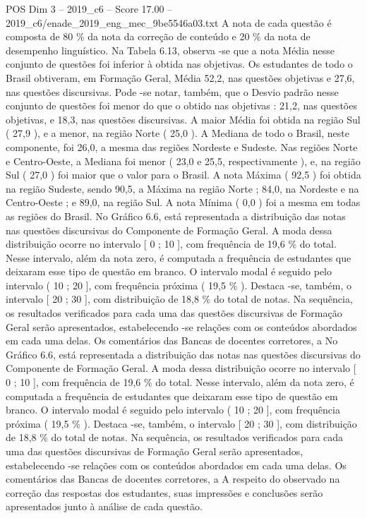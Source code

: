 \begin{textsample}{POS Dim 3 – 2019\_c6 – Score 17.00 – 2019\_c6/enade\_2019\_eng\_mec\_9be5546a03.txt}
A nota de cada questão é composta de 80 \% da nota da correção de conteúdo e 20 \% da nota de desempenho linguístico.
Na Tabela 6.13, observa -se que a nota Média nesse conjunto de questões foi inferior à obtida nas objetivas.
Os estudantes de todo o Brasil obtiveram, em Formação Geral, Média 52,2, nas questões objetivas e 27,6, nas questões discursivas.
Pode -se notar, também, que o Desvio padrão nesse conjunto de questões foi menor do que o obtido nas objetivas : 21,2, nas questões objetivas, e 18,3, nas questões discursivas.
A maior Média foi obtida na região Sul ( 27,9 ), e a menor, na região Norte ( 25,0 ).
A Mediana de todo o Brasil, neste componente, foi 26,0, a mesma das regiões Nordeste e Sudeste.
Nas regiões Norte e Centro-Oeste, a Mediana foi menor ( 23,0 e 25,5, respectivamente ), e, na região Sul ( 27,0 ) foi maior que o valor para o Brasil.
A nota Máxima ( 92,5 ) foi obtida na região Sudeste, sendo 90,5, a Máxima na região Norte ; 84,0, na Nordeste e na Centro-Oeste ; e 89,0, na região Sul.
A nota Mínima ( 0,0 ) foi a mesma em todas as regiões do Brasil.
No Gráfico 6.6, está representada a distribuição das notas nas questões discursivas do Componente de Formação Geral.
A moda dessa distribuição ocorre no intervalo [ 0 ; 10 ], com frequência de 19,6 \% do total.
Nesse intervalo, além da nota zero, é computada a frequência de estudantes que deixaram esse tipo de questão em branco.
O intervalo modal é seguido pelo intervalo ( 10 ; 20 ], com frequência próxima ( 19,5 \% ).
Destaca -se, também, o intervalo [ 20 ; 30 ], com distribuição de 18,8 \% do total de notas.
Na sequência, os resultados verificados para cada uma das questões discursivas de Formação Geral serão apresentados, estabelecendo -se relações com os conteúdos abordados em cada uma delas.
Os comentários das Bancas de docentes corretores, a No Gráfico 6.6, está representada a distribuição das notas nas questões discursivas do Componente de Formação Geral.
A moda dessa distribuição ocorre no intervalo [ 0 ; 10 ], com frequência de 19,6 \% do total.
Nesse intervalo, além da nota zero, é computada a frequência de estudantes que deixaram esse tipo de questão em branco.
O intervalo modal é seguido pelo intervalo ( 10 ; 20 ], com frequência próxima ( 19,5 \% ).
Destaca -se, também, o intervalo [ 20 ; 30 ], com distribuição de 18,8 \% do total de notas.
Na sequência, os resultados verificados para cada uma das questões discursivas de Formação Geral serão apresentados, estabelecendo -se relações com os conteúdos abordados em cada uma delas.
Os comentários das Bancas de docentes corretores, a A respeito do observado na correção das respostas dos estudantes, suas impressões e conclusões serão apresentados junto à análise de cada questão.

\end{textsample}

